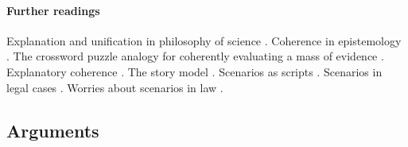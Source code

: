 \documentclass[10pt]{article}
\begin{document}

%
%



\paragraph{Further readings}

Explanation and unification 
in philosophy of science \citep{friedman1974}. 
Coherence in epistemology \citep{bonjour1985}.
The crossword puzzle analogy for coherently 
evaluating a mass of evidence \citep{haack2008}.
Explanatory coherence \citep{thagard2001}.
The story model \citep{penningtonHastie1993StoryModel}. 
Scenarios as scripts \citep{wagenaarEtal1993}.
Scenarios in legal cases \citep{griffin2013}. 
Worries about scenarios in law \citep{velleman2003}.






\subsection{Arguments}
\label{sec:coh-arg}
\end{document}
